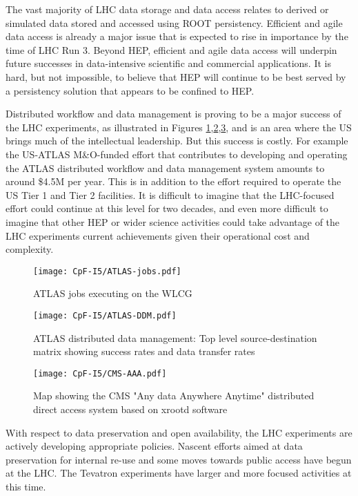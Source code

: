The vast majority of LHC data storage and data access relates to derived or simulated 
data stored and accessed using ROOT\cite{Antcheva:2009zz} persistency\cite{Canal:2011zz}.  Efficient and agile data access is 
already a major issue that is expected to rise in importance by the time of LHC Run 3.  
Beyond HEP, efficient and agile data access will underpin future successes in data-intensive 
scientific and commercial applications.  It is hard, but not impossible, to believe that HEP 
will continue to be best served by a persistency solution that appears to be confined to HEP.

Distributed workflow and data management is proving to be a major success of the LHC experiments, as 
illustrated in Figures \ref{fig:atlas-jobs},\ref{fig:atlas-ddm},\ref{fig:cms-aaa}, and is an area where the US brings much of the intellectual 
leadership.  But this success is costly. For example the US-ATLAS M\&O-funded effort that 
contributes to developing and operating the ATLAS distributed workflow and data management 
system amounts to around \$4.5M per year.  This is in addition to the effort required to operate 
the US Tier 1 and Tier 2 facilities.  It is difficult to imagine that the LHC-focused effort 
could continue at this level for two decades, and even more difficult to imagine that other HEP 
or wider science activities could take advantage of the LHC experiments current achievements 
given their operational cost and complexity. 
\begin{figure}[h]
\centering
\texttt{[image: CpF-I5/ATLAS-jobs.pdf]}
\caption{ATLAS jobs executing on the WLCG}
\label{fig:atlas-jobs}
\end{figure}
\begin{figure}[h!]
\centering
\texttt{[image: CpF-I5/ATLAS-DDM.pdf]}
\caption{ATLAS distributed data management: Top level source-destination matrix showing success rates and data transfer rates}
\label{fig:atlas-ddm}
\end{figure}
\begin{figure}[h!]
\centering
\texttt{[image: CpF-I5/CMS-AAA.pdf]}
\caption{Map showing the CMS "Any data Anywhere Anytime" distributed direct access system based on xrootd\cite{Bauerdick:2012st} software}
\label{fig:cms-aaa}
\end{figure}

With respect to data preservation and open availability, the LHC experiments are actively 
developing appropriate policies. Nascent efforts aimed at data preservation for internal 
re-use and some moves towards public access have begun at the LHC.  The Tevatron experiments 
have larger and more focused activities at this time.


